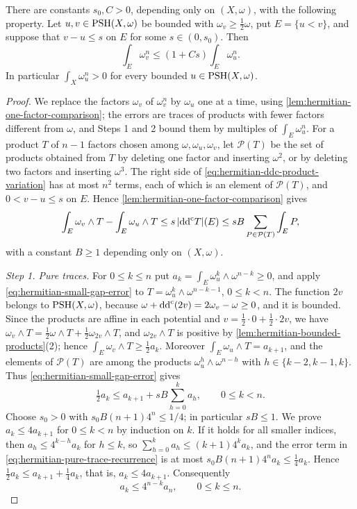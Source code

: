 \begin{proposition}\label{prop:hermitian-small-gap-comparison}
There are constants $s_0,C>0$, depending only on $(X,\omega)$, with the following property. Let $u,v\in\mathrm{PSH}(X,\omega)$ be bounded with $\omega_v\geq\tfrac12\omega$, put $E=\{u<v\}$, and suppose that $v-u\leq s$ on $E$ for some $s\in(0,s_0)$. Then
\[
 \int_E\omega_v^n\leq(1+Cs)\int_E\omega_u^n.
\]
In particular $\int_X\omega_u^n>0$ for every bounded $u\in\mathrm{PSH}(X,\omega)$.
\end{proposition}
\begin{proof}
We replace the factors $\omega_v$ of $\omega_v^n$ by $\omega_u$ one at a time, using \cref{lem:hermitian-one-factor-comparison}; the errors are traces of products with fewer factors different from $\omega$, and Steps 1 and 2 bound them by multiples of $\int_E\omega_u^n$. For a product $T$ of $n-1$ factors chosen among $\omega,\omega_u,\omega_v$, let $\mathcal P(T)$ be the set of products obtained from $T$ by deleting one factor and inserting $\omega^2$, or by deleting two factors and inserting $\omega^3$. The right side of \eqref{eq:hermitian-ddc-product-variation} has at most $n^2$ terms, each of which is an element of $\mathcal P(T)$, and $0<v-u\leq s$ on $E$. Hence \cref{lem:hermitian-one-factor-comparison} gives
\begin{equation}\label{eq:hermitian-small-gap-error}
 \int_E\omega_v\wedge T-\int_E\omega_u\wedge T\leq s\,|\mathrm{dd}^{\mathrm{c}} T|(E)\leq sB\sum_{P\in\mathcal P(T)}\int_EP,
\end{equation}
with a constant $B\geq1$ depending only on $(X,\omega)$.

\emph{Step 1. Pure traces.} For $0\leq k\leq n$ put $a_k=\int_E\omega_u^k\wedge\omega^{n-k}\geq0$, and apply \eqref{eq:hermitian-small-gap-error} to $T=\omega_u^k\wedge\omega^{n-k-1}$, $0\leq k<n$. The function $2v$ belongs to $\mathrm{PSH}(X,\omega)$, because $\omega+\mathrm{dd}^{\mathrm{c}}(2v)=2\omega_v-\omega\geq0$, and it is bounded. Since the products are affine in each potential and $v=\frac12\cdot0+\frac12\cdot2v$, we have $\omega_v\wedge T=\frac12\omega\wedge T+\frac12\omega_{2v}\wedge T$, and $\omega_{2v}\wedge T$ is positive by \cref{lem:hermitian-bounded-products}(2); hence $\int_E\omega_v\wedge T\geq\tfrac12a_k$. Moreover $\int_E\omega_u\wedge T=a_{k+1}$, and the elements of $\mathcal P(T)$ are among the products $\omega_u^h\wedge\omega^{n-h}$ with $h\in\{k-2,k-1,k\}$. Thus \eqref{eq:hermitian-small-gap-error} gives
\begin{equation}\label{eq:hermitian-pure-trace-recurrence}
 \tfrac12a_k\leq a_{k+1}+sB\sum_{h=0}^k a_h,
                  \qquad 0\leq k<n.
\end{equation}
Choose $s_0>0$ with $s_0B(n+1)4^n\leq1/4$; in particular $sB\leq1$. We prove $a_k\leq4a_{k+1}$ for $0\leq k<n$ by induction on $k$. If it holds for all smaller indices, then $a_h\leq4^{k-h}a_k$ for $h\leq k$, so $\sum_{h=0}^ka_h\leq(k+1)4^ka_k$, and the error term in \eqref{eq:hermitian-pure-trace-recurrence} is at most $s_0B(n+1)4^na_k\leq\tfrac14a_k$. Hence $\tfrac12a_k\leq a_{k+1}+\tfrac14a_k$, that is, $a_k\leq4a_{k+1}$. Consequently
\[
 a_k\leq4^{n-k}a_n,\qquad 0\leq k\leq n.
\]


\end{proof}
